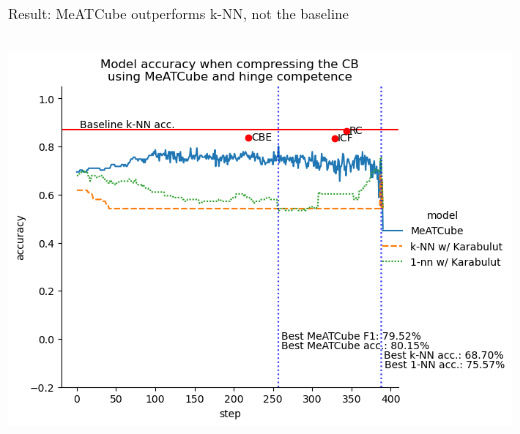 \documentclass[]{beamer}
\begin{document}
\begin{frame}{Result: MeATCube outperforms k-NN, not the baseline}
\begin{columns}
\begin{column}{.65\textwidth}
            \includegraphics[width=.8\textwidth]{../results-weight-estim+/figs/credit+approval}
        \end{column}
    \end{columns}
\end{frame}
\end{document}
